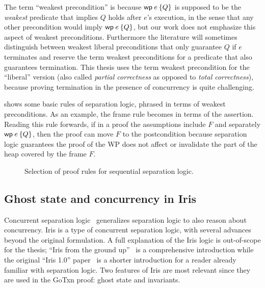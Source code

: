 The term ``weakest precondition'' is because $\wpre{e}{Q}$ is supposed to be the
\emph{weakest} predicate that implies $Q$ holds after $e$'s execution, in the
sense that any other precondition would imply $\wpre{e}{Q}$, but our work does not
emphasize this aspect of weakest preconditions. Furthermore the literature will
sometimes distinguish between weakest liberal preconditions that only guarantee
$Q$ if $e$ terminates and reserve the term weakest preconditions for a predicate
that also guarantees termination. This thesis uses the term weakest precondition for the
``liberal'' version (also called \emph{partial correctness} as opposed to
\emph{total correctness}), because proving termination in the presence of
concurrency is quite challenging.

 shows some basic rules of separation logic, phrased in terms of weakest preconditions.
As an example, the frame rule becomes
 in terms of the \wpw assertion. Reading this rule forwards, if in a proof
the assumptions include $F$
and separately $\wpre{e}{Q}$, then the proof can move $F$ to the postcondition because
separation logic guarantees the proof of the WP does not affect or invalidate
the part of the heap covered by the frame $F$.

\begin{figure}
\caption{Selection of proof rules for sequential separation logic.}
\label{fig:wp-rules}
\end{figure}

\subsection{Ghost state and concurrency in Iris}
\label{sec:perennial:concurrency}

Concurrent separation logic~\cite{brookes:csl} generalizes separation logic to
also reason about concurrency. Iris is a type of concurrent separation logic,
with several advances beyond the original formulation. A full
explanation of the Iris logic is out-of-scope for the thesis; ``Iris from the
ground up''~\cite{jung:iris-jfp} is a comprehensive introduction while the
original ``Iris 1.0'' paper~\cite{jung:iris-1} is a shorter introduction for a
reader already familiar with separation logic. Two features of Iris are most
relevant since they are used in the GoTxn proof: ghost state and invariants.

